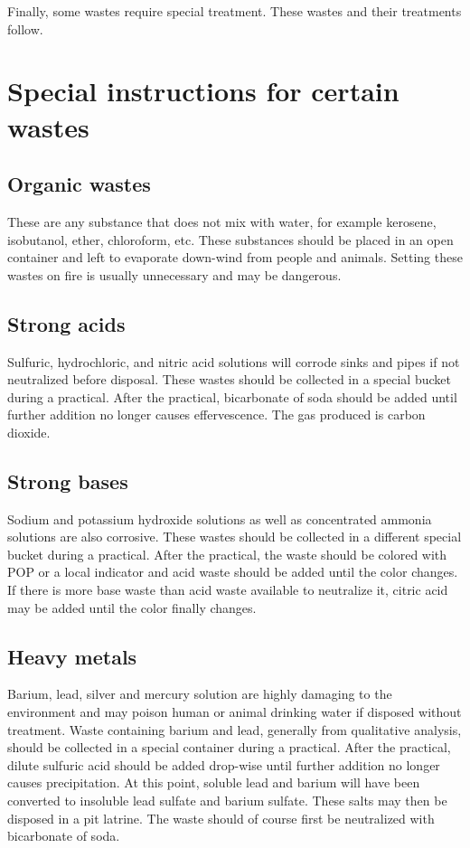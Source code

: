 Finally, some wastes require special treatment. 
These wastes and their treatments follow.

\section{Special instructions for certain wastes}
\subsection{Organic wastes} 
These are any substance that does not mix with water, 
for example kerosene, isobutanol, ether, chloroform, etc. 
These substances should be placed in an open container 
and left to evaporate down-wind from people and animals. 
Setting these wastes on fire is usually unnecessary and may be dangerous.

\subsection{Strong acids}
Sulfuric, hydrochloric, and nitric acid solutions 
will corrode sinks and pipes if not neutralized before disposal. 
These wastes should be collected in a special bucket during a practical. 
After the practical, bicarbonate of soda should be added 
until further addition no longer causes effervescence. 
The gas produced is carbon dioxide.

\subsection{Strong bases}
Sodium and potassium hydroxide solutions 
as well as concentrated ammonia solutions are also corrosive. 
These wastes should be collected 
in a different special bucket during a practical. 
After the practical, the waste should be colored with POP 
or a local indicator and acid waste should be added until the color changes. 
If there is more base waste than acid waste available to neutralize it, 
citric acid may be added until the color finally changes.

\subsection{Heavy metals}
Barium, lead, silver and mercury solution 
are highly damaging to the environment 
and may poison human or animal drinking water if disposed without treatment. 
Waste containing barium and lead, generally from qualitative analysis, 
should be collected in a special container during a practical. 
After the practical, dilute sulfuric acid should be added drop-wise 
until further addition no longer causes precipitation. 
At this point, soluble lead and barium will have been converted 
to insoluble lead sulfate and barium sulfate. 
These salts may then be disposed in a pit latrine. 
The waste should of course first be neutralized with bicarbonate of soda.

